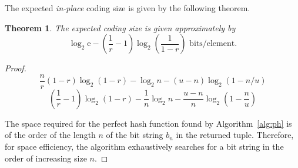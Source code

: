 \documentclass[hidelinks,11pt,final]{article}
\newcommand{\envnumstyle}{section}
\theoremstyle{plain}
\newtheorem{theorem}{Theorem}[\envnumstyle]
\begin{document}
The expected \emph{in-place} coding size is given by the following theorem.
\begin{theorem}
The expected coding size is given approximately by
\begin{equation}
\label{eq:code_size}
    \log_2 \mathrm{e} - \left(\frac{1}{r} - 1\right) \log_2\!\left(\frac{1}{1-r}\right) \text{ bits/element}.
\end{equation}
\end{theorem}
\begin{proof}
\begin{equation}
    \frac{n}{r}(1 - r) \log_2 \left(1 - r\right) - \log_2 n - (u - n) \log_2 (1 - n/u)
\end{equation}
\begin{equation}
    \left(\frac{1}{r} - 1\right) \log_2 \left(1 - r\right) - \frac{1}{n}\log_2 n - \frac{u - n}{n} \log_2\left(1 - \frac{n}{u}\right)
\end{equation}

The space required for the perfect hash function found by Algorithm~\ref{alg:ph} is of the order of the length $n$ of the bit string $b_n$ in the returned tuple. Therefore, for space efficiency, the algorithm exhaustively searches for a bit string in the order of increasing size $n$.


\end{proof}
\end{document}

